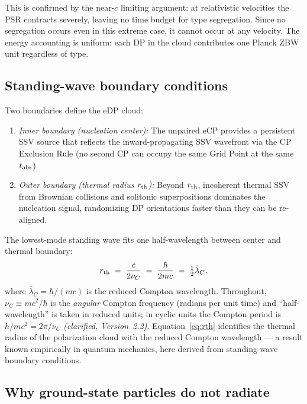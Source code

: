 \documentclass[12pt]{article}
\newcommand{\nuC}{\nu_C}
\newcommand{\lambdabar}{\bar{\lambda}}
\begin{document}
This is confirmed by the near-$c$ limiting argument: at relativistic
velocities the PSR contracts severely, leaving no time budget for type
segregation.  Since no segregation occurs even in this extreme case, it
cannot occur at any velocity.  The energy accounting is uniform: each DP
in the cloud contributes one Planck ZBW unit regardless of type.

\subsection{Standing-wave boundary conditions}

Two boundaries define the eDP cloud:

\begin{enumerate}[noitemsep]
  \item \emph{Inner boundary (nucleation center):} The unpaired eCP provides
    a persistent SSV source that reflects the inward-propagating SSV
    wavefront via the CP Exclusion Rule (no second CP can occupy the same
    Grid Point at the same $t_{\rm abs}$).

  \item \emph{Outer boundary (thermal radius $r_{\rm th}$):} Beyond $r_{\rm
    th}$, incoherent thermal SSV from Brownian collisions and solitonic
    superpositions dominates the nucleation signal, randomizing DP
    orientations faster than they can be re-aligned.
\end{enumerate}

The lowest-mode standing wave fits one half-wavelength between center and
thermal boundary:
\begin{equation}
  r_{\rm th} \;=\; \frac{c}{2\nuC} \;=\; \frac{\hbar}{2mc}
  \;=\; \tfrac{1}{2}\lambdabar_C,
  \label{eq:rth}
\end{equation}
where $\lambdabar_C = \hbar/(mc)$ is the reduced Compton wavelength.
Throughout, $\nuC \equiv mc^2/\hbar$ is the \emph{angular} Compton frequency
(radians per unit time) and ``half-wavelength'' is taken in reduced units;
in cyclic units the Compton period is $h/mc^2 = 2\pi/\nuC$ \emph{(clarified,
Version~2.2)}.
Equation~\eqref{eq:rth} identifies the thermal radius of the polarization
cloud with the reduced Compton wavelength --- a result known empirically
in quantum mechanics, here derived from standing-wave boundary conditions.

\subsection{Why ground-state particles do not radiate}
\end{document}
